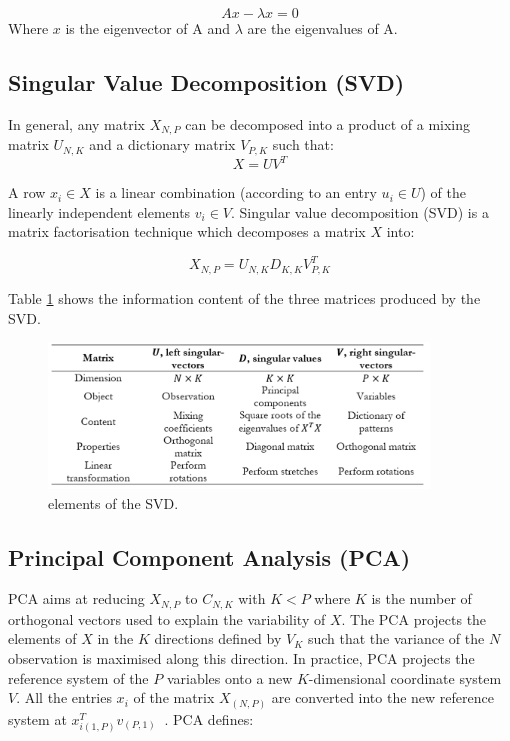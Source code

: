 \begin{equation}
Ax-\lambda x=0
\label{eq_eigenvaluesEigenvectors}
\end{equation}
Where $x$ is the eigenvector of A and $\lambda$ are the eigenvalues of A.

\subsection{Singular Value Decomposition (SVD)} \label{secSVD}
In general, any matrix $X_{N,P}$ can be decomposed into a product of a mixing matrix $U_{N,K}$ and a dictionary matrix $V_{P,K}$ such that:
\begin{equation}
X=UV^T
\label{eq_SVD1}
\end{equation}

A row $x_i\in X$ is a linear combination (according to an entry $u_i\in U$) of the linearly independent elements $v_i\in V$. Singular value decomposition (SVD) is a matrix factorisation technique which decomposes a matrix $X$ into:

\begin{equation}
X_{N,P}=U_{N,K}D_{K,K}V_{P,K}^T
\label{eq_SVD2}
\end{equation}

Table \ref{tab_svd} shows the information content of the three matrices produced by the SVD.

\begin{figure}[hbt!]
\centering
\includegraphics[width=0.9\textwidth]{SectionLetsMath/dimensionalityReduction_figures/tab_svd.png}
\captionsetup{type=table}
\caption{elements of the SVD.}
\label{tab_svd}
\end{figure}

\subsection{Principal Component Analysis (PCA)} \label{secPCA}
PCA aims at reducing  $X_{N,P}$ to $C_{N,K}$  with $K<P$ where $K$ is the number of orthogonal vectors used to explain the variability of $X$. The PCA projects the elements of $X$ in the $K$ directions defined by $V_K$ such that the variance of the $N$ observation is maximised along this direction. In practice, PCA projects the reference system of the $P$ variables onto a new $K$-dimensional coordinate system $V$. All the entries $x_i$ of the matrix $X_{\left(N,P\right)}$ are converted into the new reference system at $x_{i\left(1,P\right)}^Tv_{\left(P,1\right)}\ $ . PCA defines:

